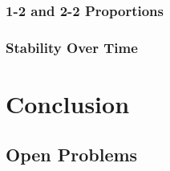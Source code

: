 \documentclass[12pt]{article}
\theoremstyle{definition}
\theoremstyle{remark}
\theoremstyle{remark}
\begin{document}
\subsubsection{1-2 and 2-2 Proportions}

\subsubsection{Stability Over Time}

\section{Conclusion}

\subsection{Open Problems}
\end{document}
